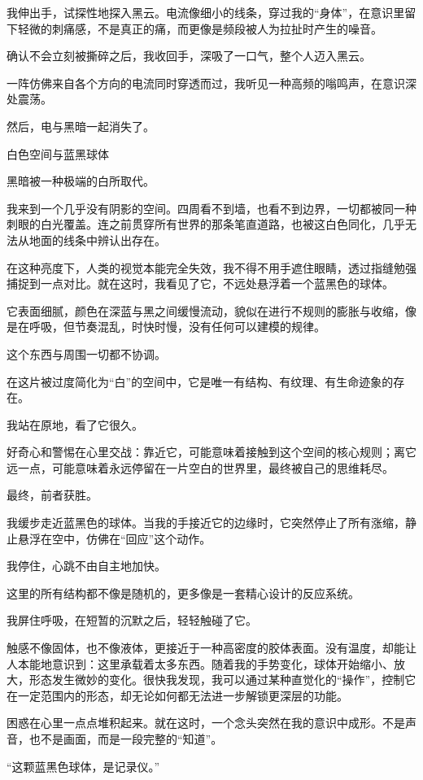 我伸出手，试探性地探入黑云。电流像细小的线条，穿过我的“身体”，在意识里留下轻微的刺痛感，不是真正的痛，而更像是频段被人为拉扯时产生的噪音。

确认不会立刻被撕碎之后，我收回手，深吸了一口气，整个人迈入黑云。

一阵仿佛来自各个方向的电流同时穿透而过，我听见一种高频的嗡鸣声，在意识深处震荡。

然后，电与黑暗一起消失了。

白色空间与蓝黑球体

黑暗被一种极端的白所取代。

我来到一个几乎没有阴影的空间。四周看不到墙，也看不到边界，一切都被同一种刺眼的白光覆盖。连之前贯穿所有世界的那条笔直道路，也被这白色同化，几乎无法从地面的线条中辨认出存在。

在这种亮度下，人类的视觉本能完全失效，我不得不用手遮住眼睛，透过指缝勉强捕捉到一点对比。就在这时，我看见了它，不远处悬浮着一个蓝黑色的球体。

它表面细腻，颜色在深蓝与黑之间缓慢流动，貌似在进行不规则的膨胀与收缩，像是在呼吸，但节奏混乱，时快时慢，没有任何可以建模的规律。

这个东西与周围一切都不协调。

在这片被过度简化为“白”的空间中，它是唯一有结构、有纹理、有生命迹象的存在。

我站在原地，看了它很久。

好奇心和警惕在心里交战：靠近它，可能意味着接触到这个空间的核心规则；离它远一点，可能意味着永远停留在一片空白的世界里，最终被自己的思维耗尽。

最终，前者获胜。

我缓步走近蓝黑色的球体。当我的手接近它的边缘时，它突然停止了所有涨缩，静止悬浮在空中，仿佛在“回应”这个动作。

我停住，心跳不由自主地加快。

这里的所有结构都不像是随机的，更多像是一套精心设计的反应系统。

我屏住呼吸，在短暂的沉默之后，轻轻触碰了它。

触感不像固体，也不像液体，更接近于一种高密度的胶体表面。没有温度，却能让人本能地意识到：这里承载着太多东西。随着我的手势变化，球体开始缩小、放大，形态发生微妙的变化。很快我发现，我可以通过某种直觉化的“操作”，控制它在一定范围内的形态，却无论如何都无法进一步解锁更深层的功能。

困惑在心里一点点堆积起来。就在这时，一个念头突然在我的意识中成形。不是声音，也不是画面，而是一段完整的“知道”。

“这颗蓝黑色球体，是记录仪。”

